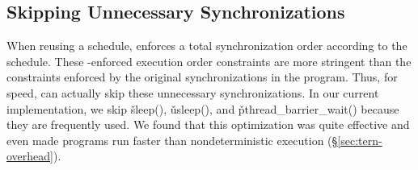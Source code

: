 




\subsection{Skipping Unnecessary Synchronizations}  \label{sec:tern-skip-waits}

When reusing a schedule, \tern enforces a total synchronization order
according to the schedule.  These \tern-enforced execution order constraints
are more stringent than the constraints enforced by the original
synchronizations in the program.  Thus, for speed, \tern can actually skip
these unnecessary synchronizations.  In our current implementation, we
skip \v{sleep()}, \v{usleep()}, and \v{pthread\_barrier\_wait()}
because they are frequently used.  We
found that this optimization was quite effective and
even made programs run faster than nondeterministic execution
(\S\ref{sec:tern-overhead}).


